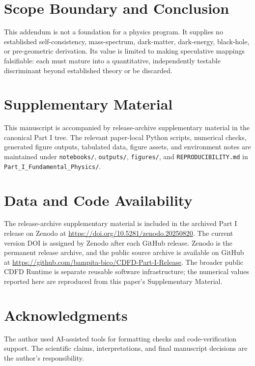 \documentclass[11pt]{article}
\begin{document}
\section{Scope Boundary and Conclusion}

This addendum is not a foundation for a physics program. It supplies no
established self-consistency, mass-spectrum, dark-matter, dark-energy,
black-hole, or pre-geometric derivation. Its value is limited to making
speculative mappings falsifiable: each must mature into a quantitative,
independently testable discriminant beyond established theory or be discarded.

\section*{Supplementary Material}

This manuscript is accompanied by release-archive supplementary material in
the canonical Part I tree. The relevant paper-local Python scripts, numerical checks, generated figure outputs,
tabulated data, figure assets, and environment notes are maintained under
\texttt{notebooks/}, \texttt{outputs/}, \texttt{figures/}, and
\texttt{REPRODUCIBILITY.md} in \texttt{Part\_I\_Fundamental\_Physics/}.


\section*{Data and Code Availability}

The release-archive supplementary material is included in the archived Part I
release on Zenodo at \url{https://doi.org/10.5281/zenodo.20250820}. The current version DOI is assigned by Zenodo after each GitHub release. Zenodo is the
permanent release archive, and the public source archive is available on GitHub at
\url{https://github.com/bampita-bico/CDFD-Part-I-Release}. The broader public CDFD
Runtime is separate reusable software infrastructure; the numerical values reported
here are reproduced from this paper's Supplementary Material.

\section*{Acknowledgments}

The author used AI-assisted tools for formatting checks and code-verification
support. The scientific claims, interpretations, and final manuscript decisions
are the author's responsibility.
\end{document}
